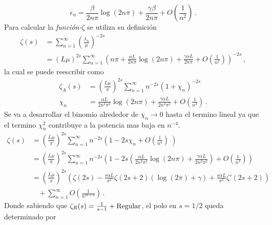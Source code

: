\begin{equation}
    \epsilon _n =  \frac{\beta }{2 n \pi} \log (2 n \pi) +
                \frac{\gamma \beta}{2 n \pi} +
                O\left(  \frac{1}{n^2} \right)
                	\, .
\end{equation}
Para calcular la {\it función-$\zeta $} se utiliza su definición
\begin{equation}
\begin{aligned}
    \zeta (s) &= \sum _{n=1} ^{\infty} \left( \frac{\lambda _n}{\mu} \right) ^{-2 s}  \\
    & =    ( L \mu ) ^{2 s} \sum _{n=1} ^{\infty} 
    \left( 
    n \pi + \frac{\alpha L }{2 n \pi} \log (2 n \pi) + \frac{\gamma \alpha L}{2 n \pi} +
    O \left( \frac{1}{n^2} \right)
    \right) ^{-2s}
    	\, ,
\end{aligned}
\end{equation}
la cual se puede reescribir como
\begin{equation}
\begin{aligned}
    \zeta _A (s) &= \left( \frac{L \mu }{\pi} \right)  ^{2 s} 
    \sum _{n=1} ^{\infty} n ^{- 2  s} 
    \left(
    	1 + \chi _n 
    	\right) ^{-2 s} \\[5pt]
		 \chi _n &= 
    	\frac{\alpha L  }{2 n^2 \pi ^2} \log (2 n \pi) + 
    	\frac{\gamma \alpha L}{2 n^2 \pi ^2 } +
    	O \left(
    		\frac{1}{n^3} \right) 
    			\, .
\end{aligned}
\end{equation}
Se va a desarrollar el binomio alrededor de  $\chi _n \rightarrow 0$ hasta el termino lineal ya que el termino $\chi _n ^2 $ contribuye a la potencia mas baja en $n ^{-4} $. 
\begin{align}\label{eq.zeta.c}
    \zeta  (s) &= \left( \frac{L \mu}{\pi} \right) ^{2 s}
    \sum _{n=1} ^{\infty} 
    n ^{-2s}
    \left(
    1 - 2 s \chi _n + O \left( \frac{1}{n ^4} \right) \
    \right)   \nonumber \\[5pt]
     &= \left( \frac{L \mu }{\pi} \right) ^{2 s}
    \sum _{n=1} ^{\infty} n ^{-2 s} 
    \left(
    1 - 2s \left(
    \frac{\alpha L }{2 n ^2 \pi ^2} \log ( 2  n \pi) + 
    \frac{\gamma \alpha L }{2 n ^2 \pi ^2} 
	\right) +
    O \left( \frac{1}{n ^{3} }  \right)
    \right) \nonumber \\[5pt]
    &=   \left( \frac{L \mu }{ \pi } \right) ^{2 s}  
    \left( \zeta (2 s) -
	\frac{ s \alpha L}{ \pi ^2} \zeta (2s+2)
	\left(
	    \log (2  \pi ) + \gamma
	\right) + 
    \frac{s \alpha L}{\pi ^2}
	\zeta '(2s+2) \right) \nonumber \\[5pt]
	&\ \ \ \  + \sum _{n=1} ^{\infty} O \left( \frac{1}{n ^{2s+3}} \right) \, .
\end{align}    
Donde sabiendo que $\zeta _R (s) = \frac{1}{s-1} + {\rm Regular} $, el polo en $s=1/2$ queda determinado por


